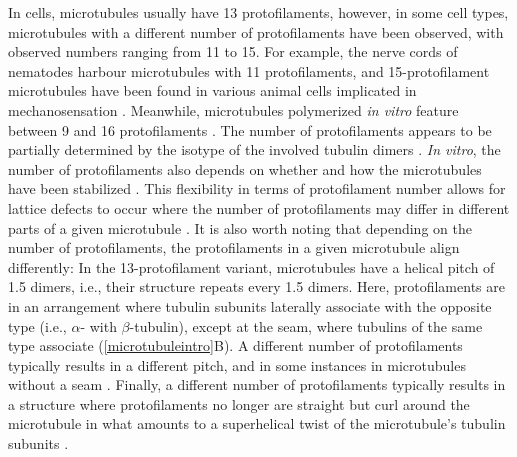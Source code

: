 In cells, microtubules usually have 13 protofilaments, however, in some cell types, microtubules with a different number of protofilaments have been observed, with observed numbers ranging from 11 to 15. For example, the nerve cords of nematodes harbour microtubules with 11 protofilaments, and 15-protofilament microtubules have been found in various animal cells implicated in mechanosensation \parencite{Chaaban2017}. Meanwhile, microtubules polymerized \textit{in vitro} feature between 9 and 16 protofilaments \parencite{Chaaban2017}. The number of protofilaments appears to be partially determined by the isotype of the involved tubulin dimers \parencite{Ti2018}. \textit{In vitro}, the number of protofilaments also depends on whether and how the microtubules have been stabilized . This flexibility in terms of protofilament number allows for lattice defects to occur where the number of protofilaments may differ in different parts of a given microtubule . It is also worth noting that depending on the number of protofilaments, the protofilaments in a given microtubule align differently: In the 13-protofilament variant, microtubules have a helical pitch of 1.5 dimers, i.e., their structure repeats every 1.5 dimers. Here, protofilaments are in an arrangement where tubulin subunits laterally associate with the opposite type (i.e., $\alpha$- with $\beta$-tubulin), except at the seam, where tubulins of the same type associate (\autoref{microtubuleintro}B). A different number of protofilaments typically results in a different pitch, and in some instances in microtubules without a seam . Finally, a different number of protofilaments typically results in a structure where protofilaments no longer are straight but curl around the microtubule in what amounts to a superhelical twist of the microtubule's tubulin subunits \parencite{Chaaban2017}.

